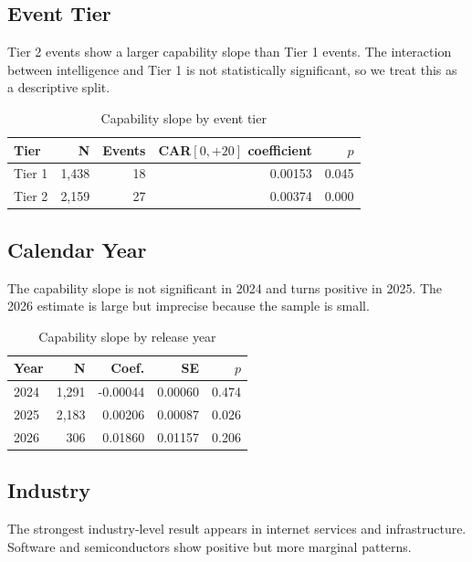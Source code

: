 \documentclass[12pt]{article}
\begin{document}
\subsection{Event Tier}

Tier 2 events show a larger capability slope than Tier 1 events. The interaction
between intelligence and Tier 1 is not statistically significant, so we treat
this as a descriptive split.

\begin{table}[htbp]
\centering
\caption{Capability slope by event tier}
\label{tab:a_tier}
\begin{tabular}{lrrrr}
\toprule
Tier & N & Events & CAR$[0,{+}20]$ coefficient & $p$ \\
\midrule
Tier 1 & 1,438 & 18 & 0.00153 & 0.045 \\
Tier 2 & 2,159 & 27 & 0.00374 & 0.000 \\
\bottomrule
\end{tabular}
\end{table}

\subsection{Calendar Year}

The capability slope is not significant in 2024 and turns positive in 2025.
The 2026 estimate is large but imprecise because the sample is small.

\begin{table}[htbp]
\centering
\caption{Capability slope by release year}
\label{tab:a_year}
\begin{tabular}{lrrrr}
\toprule
Year & N & Coef. & SE & $p$ \\
\midrule
2024 & 1,291 & -0.00044 & 0.00060 & 0.474 \\
2025 & 2,183 & 0.00206 & 0.00087 & 0.026 \\
2026 & 306 & 0.01860 & 0.01157 & 0.206 \\
\bottomrule
\end{tabular}
\end{table}

\subsection{Industry}

The strongest industry-level result appears in internet services and
infrastructure. Software and semiconductors show positive but more marginal
patterns.
\end{document}
